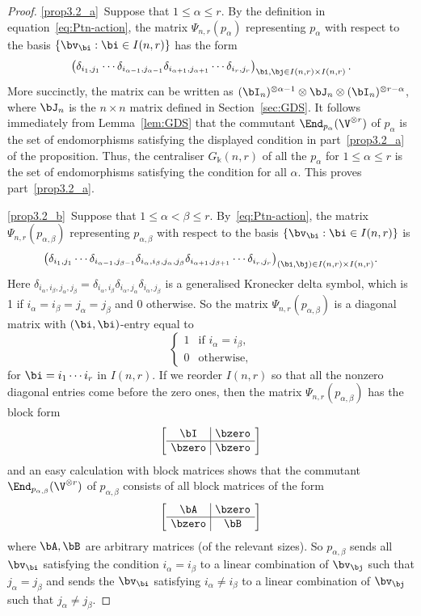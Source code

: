 \begin{proof}
%
\ref{prop3.2_a}~Suppose that $1 \le \alpha \le r$. By the definition in equation~\eqref{eq:Ptn-action}, the matrix $\Psi_{n,r}(p_{\alpha})$ representing $p_{\alpha}$ with respect to the basis $\{\bv_\bi : \bi \in I(n,r)\}$ has the form
\[
\big( \delta_{i_1,j_1} \cdots \delta_{i_{\alpha-1}, j_{\alpha-1}}
\delta_{i_{\alpha+1}, j_{\alpha+1}} \cdots \delta_{i_r, j_r} \big)_{\bi,\bj
 \in I(n,r) \times I(n,r)} \, .
\]
More succinctly, the matrix can be written as $(\bI_n)^{\otimes
 \alpha-1} \otimes \bJ_n \otimes (\bI_n)^{\otimes r-\alpha}$, where
$\bJ_n$ is the $n \times n$ matrix defined in Section~\ref{sec:GDS}. It follows immediately from Lemma~\ref{lem:GDS} that
the commutant $\End_{p_\alpha}(\V^{\otimes r})$ of $p_\alpha$
is the set of endomorphisms satisfying the displayed condition in part~\ref{prop3.2_a} of the proposition. Thus, the centraliser $G_\Bbbk(n,r)$ of all
the $p_\alpha$ for $1 \le \alpha \le r$ is the set of endomorphisms
satisfying the condition for all $\alpha$. This proves part~\ref{prop3.2_a}.
 
\ref{prop3.2_b}~Suppose that $1 \le \alpha < \beta \le r$. By~\eqref{eq:Ptn-action}, the matrix $\Psi_{n,r}(p_{\alpha,\beta})$
representing $p_{\alpha,\beta}$ with respect to the basis $\{\bv_\bi :
\bi \in I(n,r)\}$ is
\[
\big( \delta_{i_{1},j_{1}} \cdots \delta_{i_{\alpha-1},j_{\beta-1}}
\delta_{i_\alpha, i_\beta, j_\alpha, j_\beta} \delta_{i_{\alpha+1},j_{\beta+1}} \cdots
\delta_{i_r,j_r} \big)_{(\bi,\bj) \in I(n,r) \times I(n,r)}.
\]
Here $\delta_{i_\alpha, i_\beta, j_\alpha, j_\beta} = \delta_{i_\alpha,
 i_\beta} \delta_{i_\alpha, j_\alpha} \delta_{i_\alpha, j_\beta}$ is a
generalised Kronecker delta symbol, which is 1 if
$i_\alpha=i_\beta=j_\alpha=j_\beta$ and 0 otherwise. So the matrix
$\Psi_{n,r}(p_{\alpha,\beta})$ is a diagonal matrix with
$(\bi,\bi)$-entry equal to
\[
\begin{cases}
 1 & \text{if } i_\alpha
 = i_\beta ,\\
 0 & \text{otherwise},
\end{cases}
\]
for $\bi = i_1 \cdots i_r$ in $I(n,r)$. If we reorder $I(n,r)$ so
that all the nonzero diagonal entries come before the zero ones, then
the matrix $\Psi_{n,r}(p_{\alpha,\beta})$ has the block form
 \[
\setlength{\arraycolsep}{4pt}
 \left[\begin{array}{c|c} {\bI} & \bzero \\ \hline \bzero &
 \bzero\end{array}\right]
 \]
and an easy calculation with block matrices shows that the commutant
$\End_{p_{\alpha,\beta}}(\V^{\otimes r})$ of $p_{\alpha,\beta}$
consists of all block matrices of the form
 \[
\setlength{\arraycolsep}{4pt}
 \left[\begin{array}{c|c}
 \bA & \bzero \\ \hline \bzero & \bB
 \end{array}\right]
 \]
where $\bA, \bB $ are arbitrary matrices (of the relevant sizes). So
$p_{\alpha,\beta}$ sends all $\bv_\bi$ satisfying the condition
$i_\alpha = i_\beta$ to a linear combination of $\bv_\bj$ such that
$j_\alpha = j_\beta$ and sends the $\bv_\bi$ satisfying $i_\alpha \ne
i_\beta$ to a linear combination of $\bv_\bj$ such that $j_\alpha \ne
j_\beta$.


\end{proof}
